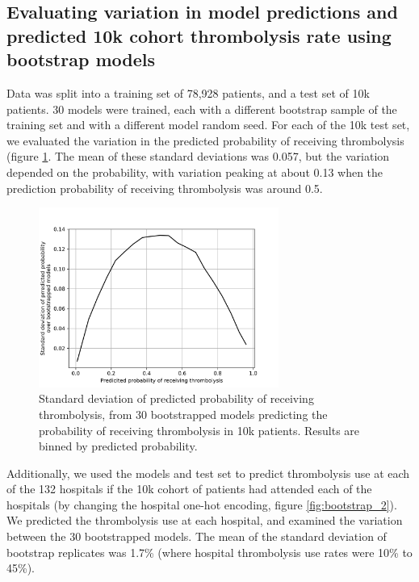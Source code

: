 
\subsection{Evaluating variation in model predictions and predicted 10k cohort thrombolysis rate using bootstrap models}

Data was split into a training set of 78,928 patients, and a test set of 10k patients. 30 models were trained, each with a different bootstrap sample of the training set and with a different model random seed. For each of the 10k test set, we evaluated the variation in the predicted probability of receiving thrombolysis (figure \ref{fig:bootstrap_1}. The mean of these standard deviations was 0.057, but the variation depended on the probability, with variation peaking at about 0.13 when the prediction probability of receiving thrombolysis was around 0.5.

\begin{figure}
\centering
\includegraphics[width=0.7\textwidth]{./images/50_bootstrap_prediction_sd}
\caption{Standard deviation of predicted probability of receiving thrombolysis, from 30 bootstrapped models predicting the probability of receiving thrombolysis in 10k patients. Results are binned by predicted probability.}
\label{fig:bootstrap_1}
\end{figure}

Additionally, we used the models and test set to predict thrombolysis use at each of the 132 hospitals if the 10k cohort of patients had attended each of the hospitals (by changing the hospital one-hot encoding, figure \ref{fig:bootstrap_2}). We predicted the thrombolysis use at each hospital, and examined the variation between the 30 bootstrapped models. The mean of the standard deviation of bootstrap replicates was 1.7\% (where hospital thrombolysis use rates were 10\% to 45\%).

